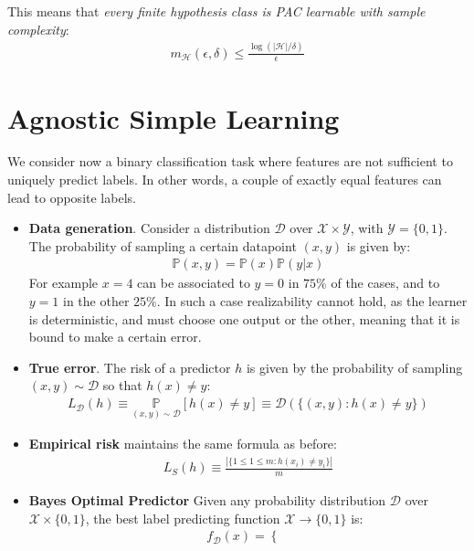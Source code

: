 \documentclass[../template.tex]{subfiles}
\begin{document}
This means that \textit{every finite hypothesis class is PAC learnable with sample complexity}:
\begin{align*}
    m_{\mathcal{H}}(\epsilon, \delta) \leq \frac{\log(|\mathcal{H}|/\delta)}{\epsilon} 
\end{align*}  

\section{Agnostic Simple Learning}
We consider now a binary classification task where features are not sufficient to uniquely predict labels. In other words, a couple of exactly equal features can lead to opposite labels.

\begin{itemize}
    \item \textbf{Data generation}. Consider a distribution $\mathcal{D}$ over $\mathcal{X}\times \mathcal{Y}$, with $\mathcal{Y}= \{0,1\}$. The probability of sampling a certain datapoint $(x, y)$ is given by:
    \begin{align*}
    \mathbb{P}(x,y) = \mathbb{P}(x) \mathbb{P}(y|x)    
    \end{align*}
    For example $x=4$ can be associated to $y=0$ in $75\%$ of the cases, and to $y=1$ in the other $25\%$. In such a case realizability cannot hold, as the learner is deterministic, and must choose one output or the other, meaning that it is bound to make a certain error.
    \item \textbf{True error}. The risk of a predictor $h$ is given by the probability of sampling $(x,y) \sim \mathcal{D}$ so that $h(x) \neq y$:
    \begin{align*}
        L_{\mathcal{D}}(h) \equiv \underset{(x,y) \sim \mathcal{D}}{\mathbb{P}} [h(x) \neq y] \equiv \mathcal{D}(\{(x,y) \colon h(x) \neq y\})
    \end{align*} 
    \item \textbf{Empirical risk} maintains the same formula as before:
    \begin{align*}
    L_S(h) \equiv \frac{|\{1 \leq 1 \leq m\colon h(x_i) \neq y_i\}|}{m}     
    \end{align*} 
    \item \textbf{Bayes Optimal Predictor} Given any probability distribution $\mathcal{D}$ over $\mathcal{X}\times \{0,1\}$, the best label predicting function $\mathcal{X} \to \{0,1\}$ is:
    \begin{align*}
        f_{\mathcal{D}}(x) = \begin{cases}

\end{cases}
\end{align*}
\end{itemize}
\end{document}

